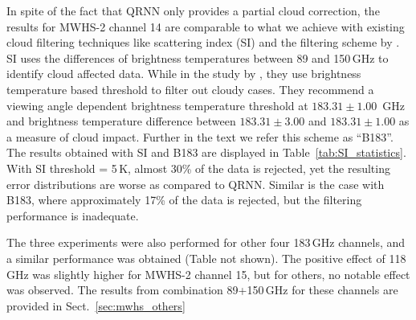 \documentclass[amt, manuscript]{copernicus}
\begin{document}
In spite of the fact that QRNN only provides a partial cloud correction, the results for  MWHS-2 channel 14 are comparable to what we achieve with existing cloud filtering techniques like scattering index (SI)  \citep{geer2015scatteringindex} and the filtering scheme by \citet{buehler:aclou:07}. SI uses the differences of brightness temperatures between 89 and 150\,GHz to identify cloud affected data. While in the study by \citet{buehler:aclou:07}, they use brightness temperature based threshold to filter out cloudy cases. They recommend a viewing angle dependent brightness temperature threshold at $183.31\pm1.00$ \,GHz and brightness temperature difference between $183.31\pm3.00$ and $183.31\pm 1.00$ as a measure of cloud impact. Further in the text we refer this scheme as ``B183''. The results obtained with SI and B183 are displayed in Table~\ref{tab:SI_statistics}. 
With SI threshold = 5\,K, almost 30\% of the data is rejected, yet the resulting error distributions are worse as compared to QRNN. Similar is the case with B183, where approximately 17\% of the data is rejected, but the filtering performance is inadequate.

The three experiments were also performed for other four 183\,GHz channels, and a similar performance was obtained (Table not shown). The positive effect of 118\,GHz was slightly higher for MWHS-2 channel 15, but for others, no notable effect was observed. The results from combination 89+150\,GHz for these channels are provided in Sect.~\ref{sec:mwhs_others} 
\end{document}
